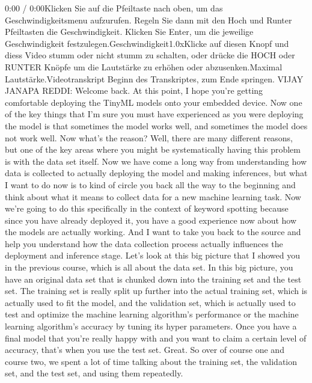     0:00 / 0:00Klicken Sie auf die Pfeiltaste nach oben, um das Geschwindigkeitsmenu aufzurufen. Regeln Sie dann mit den Hoch und Runter Pfeiltasten die Geschwindigkeit. Klicken Sie Enter, um die jeweilige Geschwindigkeit festzulegen.Geschwindigkeit1.0xKlicke auf diesen Knopf und diess Video stumm oder nicht stumm zu schalten, oder drücke die HOCH oder RUNTER Knöpfe um die Lautstärke zu erhöhen oder abzusenken.Maximal Lautstärke.Videotranskript
    Beginn des Transkriptes, zum Ende springen.
    VIJAY JANAPA REDDI: Welcome back.
    At this point, I hope you're getting comfortable deploying the TinyML
    models onto your embedded device.
    Now one of the key things that I'm sure you must have experienced
    as you were deploying the model is that sometimes the model works well,
    and sometimes the model does not work well.
    Now what's the reason?
    Well, there are many different reasons, but one
    of the key areas where you might be systematically having this problem
    is with the data set itself.
    Now we have come a long way from understanding
    how data is collected to actually deploying the model
    and making inferences, but what I want to do now
    is to kind of circle you back all the way to the beginning
    and think about what it means to collect data for a new machine learning task.
    Now we're going to do this specifically in the context of keyword
    spotting because since you have already deployed it,
    you have a good experience now about how the models are actually working.
    And I want to take you back to the source
    and help you understand how the data collection process actually influences
    the deployment and inference stage.
    Let's look at this big picture that I showed you
    in the previous course, which is all about the data set.
    In this big picture, you have an original data set
    that is chunked down into the training set and the test set.
    The training set is really split up further into the actual training
    set, which is actually used to fit the model,
    and the validation set, which is actually used to test and optimize
    the machine learning algorithm's performance
    or the machine learning algorithm's accuracy
    by tuning its hyper parameters.
    Once you have a final model that you're really happy with
    and you want to claim a certain level of accuracy,
    that's when you use the test set.
    Great.
    So over of course one and course two, we spent a lot of time
    talking about the training set, the validation set, and the test set,
    and using them repeatedly.
